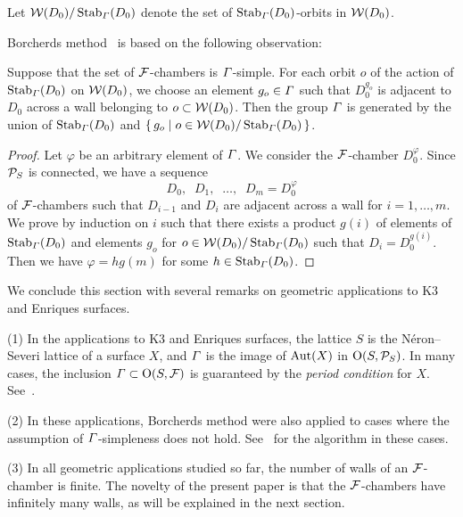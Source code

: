 \documentclass{amsart} %
\begin{document}
Let  $\mathord{\mathcal{W}}(D_0)/\operatorname{Stab}_{\varGamma}(D_0)$ denote the set of 
$\operatorname{Stab}_{\varGamma}(D_0)$-orbits in $\mathord{\mathcal{W}}(D_0)$.
\par
Borcherds method~\cite{MR913200, MR1654763} is 
based on the following  observation:
%
\begin{proposition}\label{prop:observation}
Suppose that the set of $\mathord{\mathcal{F}}$-chambers is $\varGamma$-simple.
For each orbit $o$ of the action of $\operatorname{Stab}_{\varGamma}(D_0)$  on $\mathord{\mathcal{W}}(D_0)$,
we choose an element $g_o\in \varGamma$ such that
$D_0^{g_o}$ is adjacent to $D_0$ across a wall
belonging to  $o\subset \mathord{\mathcal{W}}(D_0)$.
Then the group $\varGamma$ is generated by the union of 
$\operatorname{Stab}_{\varGamma}(D_0)$ and $\{\,{g_o}\mid {o\in \mathord{\mathcal{W}}(D_0)/\operatorname{Stab}_{\varGamma}(D_0)} \,\}$.
\end{proposition}
%
\begin{proof}
Let $\varphi$ be an arbitrary element of $\varGamma$.
We consider the $\mathord{\mathcal{F}}$-chamber $D_0^{\varphi}$.
Since $\mathord{\mathcal{P}}_S$ is connected, 
we have a sequence
\[
D_0, \;\; D_1,  \;\;  \dots,  \;\;  D_m=D_0^{\varphi}
\]
of $\mathord{\mathcal{F}}$-chambers such that $D_{i-1}$ and $D_i$ are 
adjacent across a wall for $i=1, \dots, m$.
We prove by induction on $i$
such that there exists 
a product $g(i)$ of elements of $\operatorname{Stab}_{\varGamma}(D_0)$ and 
 elements $g_o$ for $o\in \mathord{\mathcal{W}}(D_0)/\operatorname{Stab}_{\varGamma}(D_0)$
such that $D_i=D_0^{g(i)}$.
Then we have $\varphi=h g(m) $ for some $h\in \operatorname{Stab}_{\varGamma}(D_0)$.
\end{proof}
%
We conclude this section with several remarks on geometric applications
to K3 and Enriques surfaces. 
%
\begin{remark}\label{rem:geom}
(1) 
In the  applications to K3 and Enriques surfaces, 
the lattice $S$ is the N\'eron--Severi lattice of a surface $X$,
and $\varGamma$ is the image of $\operatorname{Aut}(X)$ in $\mathord{\mathrm{O}}(S,\mathord{\mathcal{P}}_S)$.
In many cases, the inclusion
$\varGamma \subset \mathord{\mathrm{O}}(S,\mathord{\mathcal{F}})$
is guaranteed by the \emph{period condition} for $X$.
See~\cite[Section~5.2]{MR4759604}.
\par
(2) 
In these  applications, 
Borcherds method were also  applied to  cases where 
the assumption of  $\varGamma$-simpleness does not hold.
See~\cite[Section 5.1]{MR4759604}  for the algorithm
in these cases.
%
\par
(3) 
In all geometric applications studied so far,
the number of walls of an $\mathord{\mathcal{F}}$-chamber is finite.
The novelty of the present  paper is that
the $\mathord{\mathcal{F}}$-chambers  have infinitely many walls,
as will be explained in the next section.
\end{remark}
%
%
\end{document}
